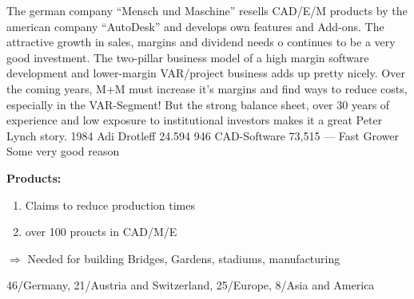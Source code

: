 \documentclass{company_analysis}
\begin{document}


\story
    {The german company \enquote{Mensch und Maschine} resells CAD/E/M
    products by the american company \enquote{AutoDesk} and develops
    own features and Add-ons. The attractive growth in sales, margins
    and dividend needs o continues to be a very good investment. The
    two-pillar business model of a high margin software development and
    lower-margin VAR/project business adds up pretty nicely. Over the
    coming years, M+M must increase it's margins and find ways to reduce
    costs, especially in the VAR-Segment! But the strong balance sheet,
    over 30 years of experience and low exposure to institutional investors
    makes it a great Peter Lynch story.}
\infosection
    {1984}
    {Adi Drotleff}
    {24.594}
    {946}
    {CAD-Software}
    {73,515}
    {---}
    {Fast Grower}
    {Some very good reason}



\begin{minipage}{.6\linewidth}
    \faArchive\space\textbf{Products:}
    \begin{enumerate}
        \item Claims to reduce production times
        \item over 100 proucts in CAD/M/E
    \end{enumerate}
    $\Rightarrow$ Needed for building Bridges, Gardens, stadiums, manufacturing
\end{minipage}
        \begin{piechart}[Revenue 2019]
            {46/Germany, 21/Austria and Switzerland, 25/Europe, 8/Asia and America}
        \end{piechart}



\end{document}

